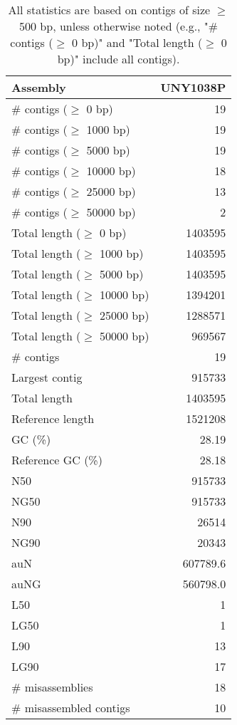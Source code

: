 \documentclass[12pt,a4paper]{article}
\begin{document}
\begin{table}[ht]
\begin{center}
\caption{All statistics are based on contigs of size $\geq$ 500 bp, unless otherwise noted (e.g., "\# contigs ($\geq$ 0 bp)" and "Total length ($\geq$ 0 bp)" include all contigs).}
\begin{tabular}{|l*{1}{|r}|}
\hline
Assembly & UNY1038P \\ \hline
\# contigs ($\geq$ 0 bp) & 19 \\ \hline
\# contigs ($\geq$ 1000 bp) & 19 \\ \hline
\# contigs ($\geq$ 5000 bp) & 19 \\ \hline
\# contigs ($\geq$ 10000 bp) & 18 \\ \hline
\# contigs ($\geq$ 25000 bp) & 13 \\ \hline
\# contigs ($\geq$ 50000 bp) & 2 \\ \hline
Total length ($\geq$ 0 bp) & 1403595 \\ \hline
Total length ($\geq$ 1000 bp) & 1403595 \\ \hline
Total length ($\geq$ 5000 bp) & 1403595 \\ \hline
Total length ($\geq$ 10000 bp) & 1394201 \\ \hline
Total length ($\geq$ 25000 bp) & 1288571 \\ \hline
Total length ($\geq$ 50000 bp) & 969567 \\ \hline
\# contigs & 19 \\ \hline
Largest contig & 915733 \\ \hline
Total length & 1403595 \\ \hline
Reference length & 1521208 \\ \hline
GC (\%) & 28.19 \\ \hline
Reference GC (\%) & 28.18 \\ \hline
N50 & 915733 \\ \hline
NG50 & 915733 \\ \hline
N90 & 26514 \\ \hline
NG90 & 20343 \\ \hline
auN & 607789.6 \\ \hline
auNG & 560798.0 \\ \hline
L50 & 1 \\ \hline
LG50 & 1 \\ \hline
L90 & 13 \\ \hline
LG90 & 17 \\ \hline
\# misassemblies & 18 \\ \hline
\# misassembled contigs & 10 \\ \hline

\end{tabular}
\end{center}
\end{table}
\end{document}
